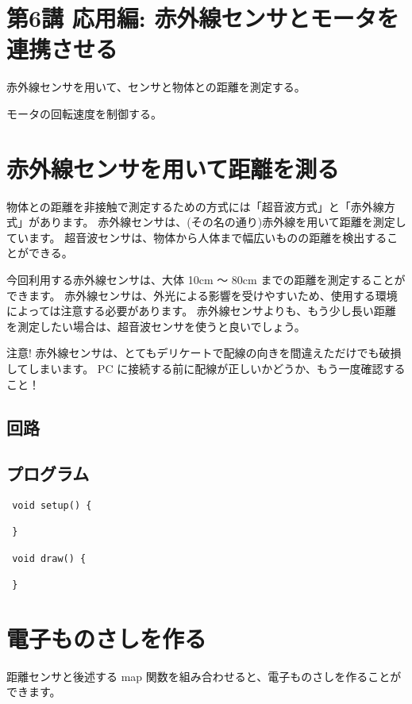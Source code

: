 \documentclass[11pt,a4paper]{jarticle}
\begin{document}
\section*{\LARGE{第6講 応用編: 赤外線センサとモータを連携させる}}
赤外線センサを用いて、センサと物体との距離を測定する。

モータの回転速度を制御する。


\section{赤外線センサを用いて距離を測る}
物体との距離を非接触で測定するための方式には「超音波方式」と「赤外線方式」があります。
赤外線センサは、(その名の通り)赤外線を用いて距離を測定しています。
超音波センサは、物体から人体まで幅広いものの距離を検出することができる。

今回利用する赤外線センサは、大体 10cm 〜 80cm までの距離を測定することができます。
赤外線センサは、外光による影響を受けやすいため、使用する環境によっては注意する必要があります。
赤外線センサよりも、もう少し長い距離を測定したい場合は、超音波センサを使うと良いでしょう。

\begin{itembox}[l]{注意!}
 赤外線センサは、とてもデリケートで配線の向きを間違えただけでも破損してしまいます。
 PC に接続する前に配線が正しいかどうか、もう一度確認すること！
\end{itembox}

\subsection*{回路}


\subsection*{プログラム}
\begin{lstlisting}
 void setup() {

 }

 void draw() {

 }
\end{lstlisting}


\section{電子ものさしを作る}
距離センサと後述する map 関数を組み合わせると、電子ものさしを作ることができます。
\end{document}
